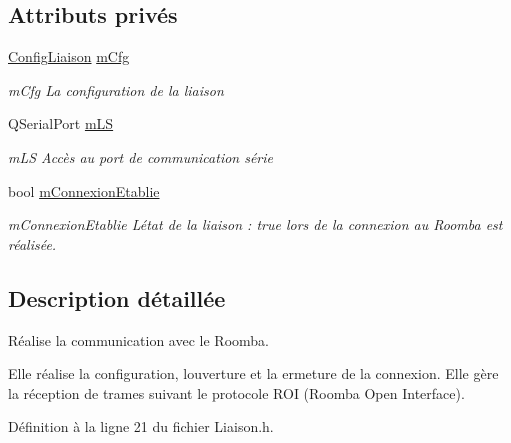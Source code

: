 \subsection*{Attributs privés}
\begin{DoxyCompactItemize}
\item 
\hyperlink{class_config_liaison}{Config\+Liaison} \hyperlink{class_liaison_a0357bc6671680d6b495fe25ce6d2b128}{m\+Cfg}\hypertarget{class_liaison_a0357bc6671680d6b495fe25ce6d2b128}{}\label{class_liaison_a0357bc6671680d6b495fe25ce6d2b128}

\begin{DoxyCompactList}\small\item\em m\+Cfg La configuration de la liaison \end{DoxyCompactList}\item 
Q\+Serial\+Port \hyperlink{class_liaison_a94a391d4b617c092e4cc3fd1d4397a6c}{m\+LS}\hypertarget{class_liaison_a94a391d4b617c092e4cc3fd1d4397a6c}{}\label{class_liaison_a94a391d4b617c092e4cc3fd1d4397a6c}

\begin{DoxyCompactList}\small\item\em m\+LS Accès au port de communication série \end{DoxyCompactList}\item 
bool \hyperlink{class_liaison_a9832b59d823545937decd984070c461e}{m\+Connexion\+Etablie}\hypertarget{class_liaison_a9832b59d823545937decd984070c461e}{}\label{class_liaison_a9832b59d823545937decd984070c461e}

\begin{DoxyCompactList}\small\item\em m\+Connexion\+Etablie L\textquotesingle{}état de la liaison \+: true lors de la connexion au Roomba est réalisée. \end{DoxyCompactList}\end{DoxyCompactItemize}


\subsection{Description détaillée}
Réalise la communication avec le Roomba. 

Elle réalise la configuration, l\textquotesingle{}ouverture et la ermeture de la connexion. Elle gère la réception de trames suivant le protocole R\+OI (Roomba Open Interface). 

Définition à la ligne 21 du fichier Liaison.\+h.



